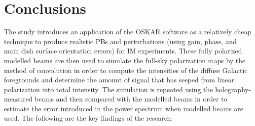  
%     
\section{Conclusions} \label{sec:conclusions}
The study introduces an application of the OSKAR software as a relatively cheap technique to produce realistic PBs and perturbations
(using gain, phase, and main dish surface orientation errors) for IM experiments. These fully polarized modelled beams are then
used to simulate the full-sky polarization maps by the method of convolution in order to compute the intensities of the diffuse
Galactic foregrounds and determine the amount of signal that has seeped from linear polarization into total intensity. The simulation is
repeated using the holography-measured beams and then compared with the modelled beams in order to estimate the error introduced in
the power spectrum when modelled beams are used. The following are the key findings of the research:

